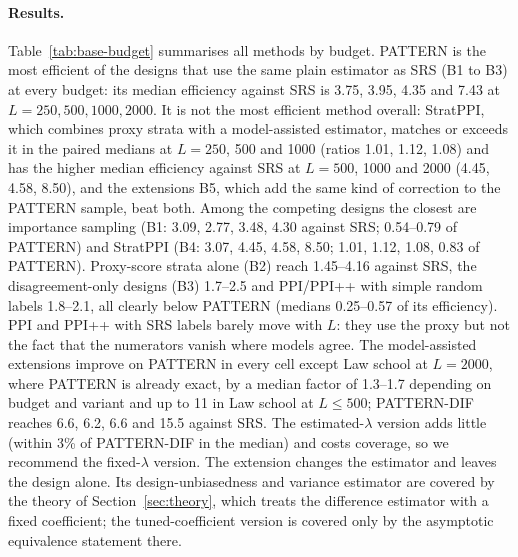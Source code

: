 

\paragraph{Results.} Table~\ref{tab:base-budget} summarises all methods by budget. PATTERN is the most efficient of the designs that use the same plain estimator as SRS (B1 to B3) at every budget: its median efficiency against SRS is 3.75, 3.95, 4.35 and 7.43 at $L=250,500,1000,2000$. It is not the most efficient method overall: StratPPI, which combines proxy strata with a model-assisted estimator, matches or exceeds it in the paired medians at $L=250$, 500 and 1000 (ratios 1.01, 1.12, 1.08) and has the higher median efficiency against SRS at $L=500$, 1000 and 2000 (4.45, 4.58, 8.50), and the extensions B5, which add the same kind of correction to the PATTERN sample, beat both. Among the competing designs the closest are importance sampling (B1: 3.09, 2.77, 3.48, 4.30 against SRS; 0.54--0.79 of PATTERN) and StratPPI (B4: 3.07, 4.45, 4.58, 8.50; 1.01, 1.12, 1.08, 0.83 of PATTERN). Proxy-score strata alone (B2) reach 1.45--4.16 against SRS, the disagreement-only designs (B3) 1.7--2.5 and PPI/PPI++ with simple random labels 1.8--2.1, all clearly below PATTERN (medians 0.25--0.57 of its efficiency). PPI and PPI++ with SRS labels barely move with $L$: they use the proxy but not the fact that the numerators vanish where models agree. The model-assisted extensions improve on PATTERN in every cell except Law school at $L=2000$, where PATTERN is already exact, by a median factor of 1.3--1.7 depending on budget and variant and up to 11 in Law school at $L\le500$; PATTERN-DIF reaches 6.6, 6.2, 6.6 and 15.5 against SRS. The estimated-$\lambda$ version adds little (within 3\% of PATTERN-DIF in the median) and costs coverage, so we recommend the fixed-$\lambda$ version. The extension changes the estimator and leaves the design alone. Its design-unbiasedness and variance estimator are covered by the theory of Section~\ref{sec:theory}, which treats the difference estimator with a fixed coefficient; the tuned-coefficient version is covered only by the asymptotic equivalence statement there.

